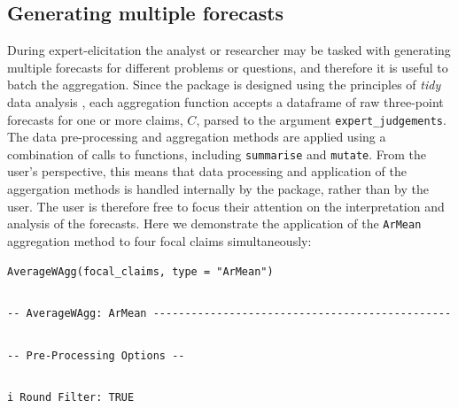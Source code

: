 \documentclass[article]{jss}
\begin{document}
\hypertarget{generating-multiple-forecasts}{%
\subsection{Generating multiple
forecasts}\label{generating-multiple-forecasts}}

During expert-elicitation the analyst or researcher may be tasked with
generating multiple forecasts for different problems or questions, and
therefore it is useful to batch the aggregation. Since the
 package is designed using the principles of \emph{tidy}
data analysis \citep{tidyverse2019}, each aggregation function accepts a
dataframe of raw three-point forecasts for one or more claims, \(C\),
parsed to the argument \texttt{expert\_judgements}. The data
pre-processing and aggregation methods are applied using a combination
of calls to  functions, including \texttt{summarise} and
\texttt{mutate}. From the user's perspective, this means that data
processing and application of the aggergation methods is handled
internally by the  package, rather than by the user. The
user is therefore free to focus their attention on the interpretation
and analysis of the forecasts. Here we demonstrate the application of
the \texttt{ArMean} aggregation method to four focal claims
simultaneously:

\begin{verbatim}
AverageWAgg(focal_claims, type = "ArMean")
\end{verbatim}

\begin{verbatim}
\end{verbatim}

\begin{verbatim}
-- AverageWAgg: ArMean -----------------------------------------------
\end{verbatim}

\begin{verbatim}
\end{verbatim}

\begin{verbatim}
-- Pre-Processing Options --
\end{verbatim}

\begin{verbatim}
\end{verbatim}

\begin{verbatim}
i Round Filter: TRUE
\end{verbatim}
\end{document}
